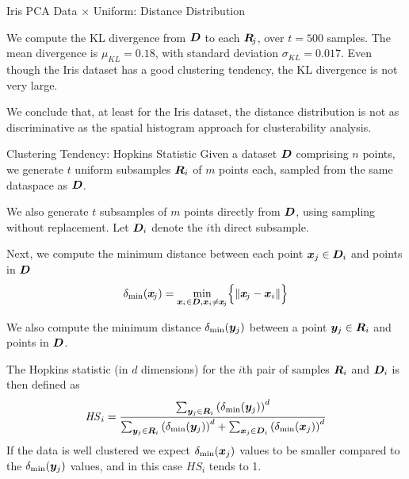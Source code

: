 \begin{frame}[fragile]{Iris PCA Data $\times$ Uniform: Distance Distribution}

We compute the KL divergence from ${\boldsymbol D}$ to each ${\boldsymbol R}_{\!j}$, over
 $t=500$ samples. 
 The mean divergence is
 $\mu_{\mathit{KL}} = 0.18$, with standard deviation $\sigma_{\mathit{KL}}=0.017$.
 Even though the Iris dataset
 has a good clustering tendency, the KL divergence is not very large.

\begin{figure}
  \centering
  \captionsetup[subfloat]{captionskip=30pt}
    \def\pshlabel#1{ {\footnotesize #1}}
    \def\psvlabel#1{ {\footnotesize #1}}
    \centerline{
    }
\end{figure}

We conclude that, at least for the Iris dataset, the distance distribution is
not as discriminative as the spatial histogram approach for
clusterability analysis.
\end{frame}



\begin{frame}{Clustering Tendency: Hopkins Statistic}
Given a dataset ${\boldsymbol D}$ comprising $n$ points,
we generate $t$ uniform subsamples ${\boldsymbol R}_i$ of $m$ points each, 
sampled from the same dataspace as ${\boldsymbol D}$.

\medskip
We also generate $t$ subsamples of $m$ points
directly from ${\boldsymbol D}$, using sampling without replacement. Let ${\boldsymbol D}_i$
denote the $i$th direct subsample. 

\medskip
Next, we compute the minimum distance
between each point ${\boldsymbol x}_{j} \in {\boldsymbol D}_i$ and points in ${\boldsymbol D}$
\begin{align*}
  \delta_{\min}({\boldsymbol x}_{\!j}) = \min_{{\boldsymbol x}_i \in {\boldsymbol D}, {\boldsymbol x}_i \ne {\boldsymbol x}_{\!j}}
  \Bigl\{\left\lVert{\boldsymbol x}_{\!j}- {\boldsymbol x}_i\right\rVert\Bigr\}
\end{align*}

We
also compute the minimum distance $\delta_{\min}({\boldsymbol y}_{j})$
between a point ${\boldsymbol y}_{j} \in {\boldsymbol R}_i$ and
points in ${\boldsymbol D}$.

\medskip
The Hopkins statistic (in $d$ dimensions) for the $i$th pair of samples ${\boldsymbol R}_i$ and ${\boldsymbol D}_i$ is then def\/{i}ned as
\begin{align*}
  \mathit{HS}_i = \frac{\sum_{{\boldsymbol y}_{j} \in {\boldsymbol R}_i} \left(\delta_{\min}({\boldsymbol y}_{j})\right)^d}
  {\sum_{{\boldsymbol y}_{j} \in {\boldsymbol R}_i} \left(\delta_{\min}({\boldsymbol y}_{j})\right)^d +
  \sum_{{\boldsymbol x}_{j} \in {\boldsymbol D}_i} \left(\delta_{\min}({\boldsymbol x}_{j})\right)^d}
\end{align*}
If the data is well clustered we expect $\delta_{\min}({\boldsymbol x}_{j})$ values to
be smaller compared to the $\delta_{\min}({\boldsymbol y}_{j})$ values, and in this
case $\mathit{HS}_i$ tends to 1. 
\end{frame}


